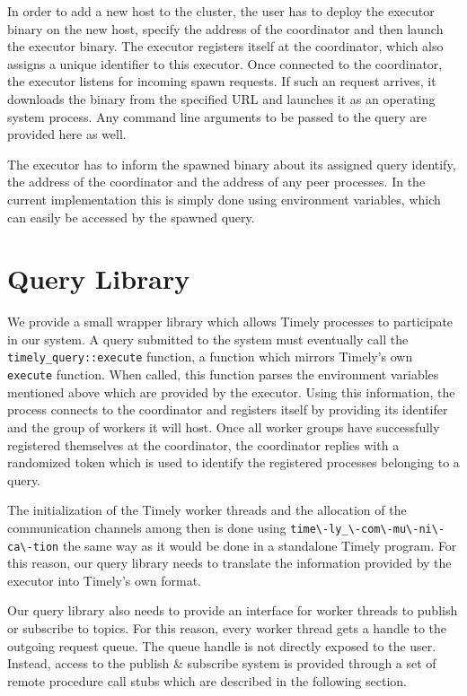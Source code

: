 In order to add a new host to the cluster, the user has to deploy the executor
binary on the new host, specify the address of the coordinator and then launch
the executor binary. The executor registers itself at the coordinator, which
also assigns a unique identifier to this executor. Once connected to the
coordinator, the executor listens for incoming spawn requests. If such an
request arrives, it downloads the binary from the specified URL and launches
it as an operating system process. Any command line arguments to be passed
to the query are provided here as well.

The executor has to inform the spawned binary about its assigned query identify,
the address of the coordinator and the address of any peer processes. In the
current implementation this is simply done using environment variables, which
can easily be accessed by the spawned query.


\section{Query Library}

We provide a small wrapper library which allows Timely processes to participate
in our system. A query submitted to the system must eventually call the 
\lstinline{timely_query::execute} function, a function which mirrors Timely's
own \lstinline{execute} function. When called, this function parses the
environment variables mentioned above which are provided by the executor.
Using this information, the process connects to the coordinator and registers
itself by providing its identifer and the group of workers it will host. Once
all worker groups have successfully registered themselves at the coordinator,
the coordinator replies with a randomized token which is used to identify
the registered processes belonging to a query. 

The initialization of the Timely worker threads and the allocation of the
communication channels among then is done using \lstinline{time\-ly_\-com\-mu\-ni\-ca\-tion}
the same way as it would be done in a standalone Timely program. For this
reason, our query library needs to translate the information provided by the
executor into Timely's own format.

Our query library also needs to provide an interface for worker threads to
publish or subscribe to topics. For this reason, every worker thread gets
a handle to the outgoing request queue. The queue handle is not directly exposed
to the user. Instead, access to the publish \& subscribe system is provided
through a set of remote procedure call stubs which are described in the
following section.

